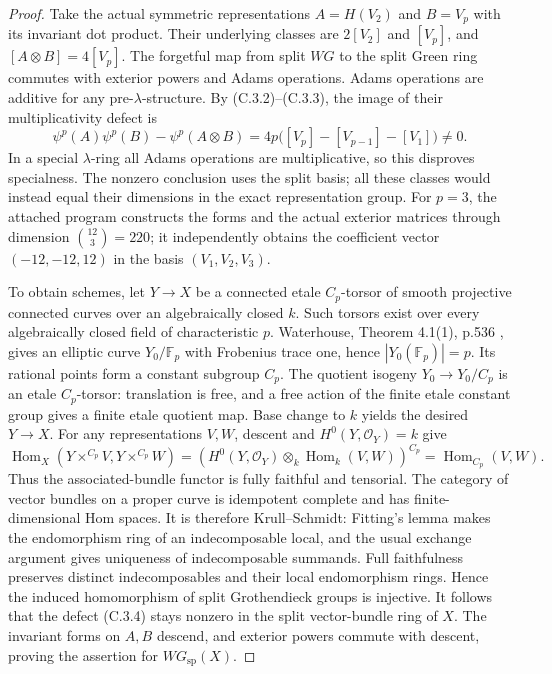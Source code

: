 \begin{proof}
Take the actual symmetric representations
$A=H(V_2)$ and $B=V_p$ with its invariant dot product. Their underlying
classes are $2[V_2]$ and $[V_p]$, and $[A\otimes B]=4[V_p]$.
The forgetful map from split $WG$ to the split Green ring commutes with
exterior powers and Adams operations. Adams operations are additive for any
pre-$\lambda$-structure. By (C.3.2)--(C.3.3), the image of their
multiplicativity defect is
\[
 \psi^p(A)\psi^p(B)-\psi^p(A\otimes B)
       =4p\bigl([V_p]-[V_{p-1}]-[V_1]\bigr)\ne0.        \tag{C.3.4}
\]
In a special $\lambda$-ring all Adams operations are multiplicative, so
this disproves specialness. The nonzero conclusion uses the split basis;
all these classes would instead equal their dimensions in the exact
representation group. For $p=3$, the attached program constructs the forms
and the actual exterior matrices through dimension $\binom{12}{3}=220$;
it independently obtains the coefficient vector $(-12,-12,12)$ in the
basis $(V_1,V_2,V_3)$.

To obtain schemes, let $Y\to X$ be a connected etale $C_p$-torsor of smooth
projective connected curves over an algebraically closed $k$.
Such torsors exist over every algebraically closed field of characteristic
$p$. Waterhouse, Theorem 4.1(1), p.536 \cite{C-Waterhouse1969}, gives an
elliptic curve $Y_0/\mathbb F_p$ with Frobenius trace one, hence
$|Y_0(\mathbb F_p)|=p$. Its rational points form a constant subgroup $C_p$.
The quotient isogeny $Y_0\to Y_0/C_p$ is an etale $C_p$-torsor: translation
is free, and a free action of the finite etale constant group gives a finite
etale quotient map. Base change to $k$ yields the desired $Y\to X$.
For any representations $V,W$, descent and $H^0(Y,\mathcal O_Y)=k$ give
\[
 \operatorname{Hom}_X(Y\times^{C_p}V,Y\times^{C_p}W)
       =(H^0(Y,\mathcal O_Y)\otimes_k\operatorname{Hom}_k(V,W))^{C_p}
       =\operatorname{Hom}_{C_p}(V,W).
\]
Thus the associated-bundle functor is fully faithful and tensorial.
The category of vector bundles on a proper curve is idempotent complete
and has finite-dimensional Hom spaces. It is therefore Krull--Schmidt:
Fitting's lemma makes the endomorphism ring of an indecomposable local, and
the usual exchange argument gives uniqueness of indecomposable summands.
Full faithfulness preserves distinct indecomposables and their local
endomorphism rings. Hence the induced homomorphism of split Grothendieck
groups is injective. It follows that the defect (C.3.4) stays nonzero in
the split vector-bundle ring of $X$. The invariant forms on $A,B$ descend,
and exterior powers commute with descent, proving the assertion for
$WG_{\mathrm{sp}}(X)$.
\end{proof}

